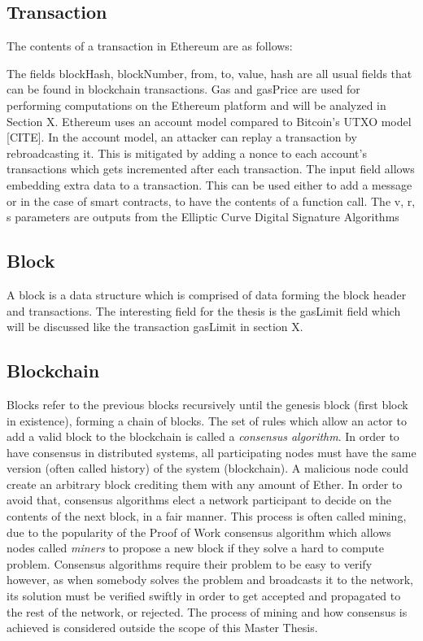 \subsection{Transaction}
The contents of a transaction in Ethereum are as follows:


The fields blockHash, blockNumber, from, to, value, hash are all usual fields that can be found in blockchain transactions. Gas and gasPrice are used for performing computations on the Ethereum platform and will be analyzed in Section X. Ethereum uses an account model compared to Bitcoin's UTXO model [CITE]. In the account model, an attacker can replay a transaction by rebroadcasting it. This is mitigated by adding a nonce to each account's transactions which gets incremented after each transaction. The input field allows embedding extra data to a transaction. This can be used either to add a message or in the case of smart contracts, to have the contents of a function call. The v, r, s parameters are outputs from the Elliptic Curve Digital Signature Algorithms %

\subsection{Block}
A block is a data structure which is comprised of data forming the block header and transactions. The interesting field for the thesis is the gasLimit field which will be discussed like the transaction gasLimit in section X. 


\subsection{Blockchain}
Blocks refer to the previous blocks recursively until the genesis block (first block in existence), forming a chain of blocks. The set of rules which allow an actor to add a valid block to the blockchain is called a \textit{consensus algorithm}. In order to have consensus in distributed systems, all participating nodes must have the same version (often called history) of the system (blockchain). A malicious node could create an arbitrary block crediting them with any amount of Ether. In order to avoid that, consensus algorithms elect a network participant to decide on the contents of the next block, in a fair manner. This process is often called mining, due to the popularity of the Proof of Work consensus algorithm which allows nodes called \textit{miners} to propose a new block if they solve a hard to compute problem. Consensus algorithms require their problem to be easy to verify however, as when somebody solves the problem and broadcasts it to the network, its solution must be verified swiftly in order to get accepted and propagated to the rest of the network, or rejected. The process of mining and how consensus is achieved is considered outside the scope of this Master Thesis.

